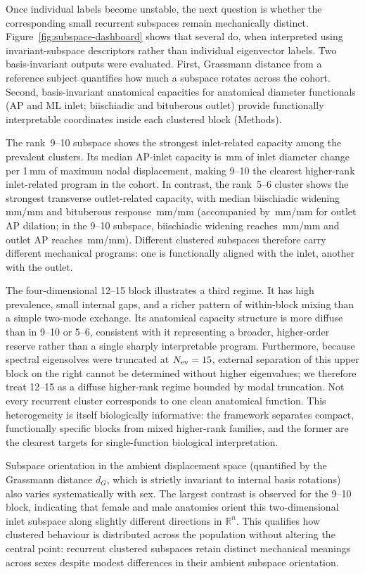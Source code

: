 \documentclass[11pt]{article}
\begin{document}
Once individual labels become unstable, the next question is whether the corresponding small recurrent subspaces remain mechanically distinct.
Figure~\ref{fig:subspace-dashboard} shows that several do, when interpreted using invariant-subspace descriptors rather than individual eigenvector labels.
Two basis-invariant outputs were evaluated.
First, Grassmann distance from a reference subject quantifies how much a subspace rotates across the cohort.
Second, basis-invariant anatomical capacities for anatomical diameter functionals (AP and ML inlet; biischiadic and bituberous outlet) provide functionally interpretable coordinates inside each clustered block (Methods).

The rank~9--10 subspace shows the strongest inlet-related capacity among the prevalent clusters.
Its median AP-inlet capacity is \BlockNineTenAP\,mm of inlet diameter change per 1\,mm of maximum nodal displacement, making 9--10 the clearest higher-rank inlet-related program in the cohort.
In contrast, the rank~5--6 cluster shows the strongest transverse outlet-related capacity, with median biischiadic widening \BlockFiveSixBIS\,mm/mm and bituberous response \BlockFiveSixBIT\,mm/mm (accompanied by \BlockFiveSixOUTLETAP\,mm/mm for outlet AP dilation; in the 9--10 subspace, biischiadic widening reaches \BlockNineTenBIS\,mm/mm and outlet AP reaches \BlockNineTenOUTLETAP\,mm/mm).
Different clustered subspaces therefore carry different mechanical programs: one is functionally aligned with the inlet, another with the outlet.

The four-dimensional 12--15 block illustrates a third regime.
It has high prevalence, small internal gaps, and a richer pattern of within-block mixing than a simple two-mode exchange.
Its anatomical capacity structure is more diffuse than in 9--10 or 5--6, consistent with it representing a broader, higher-order reserve rather than a single sharply interpretable program.
Furthermore, because spectral eigensolves were truncated at $N_{\rm ev}=15$, external separation of this upper block on the right cannot be determined without higher eigenvalues; we therefore treat 12--15 as a diffuse higher-rank regime bounded by modal truncation.
Not every recurrent cluster corresponds to one clean anatomical function.
This heterogeneity is itself biologically informative: the framework separates compact, functionally specific blocks from mixed higher-rank families, and the former are the clearest targets for single-function biological interpretation.


Subspace orientation in the ambient displacement space (quantified by the Grassmann distance $d_G$, which is strictly invariant to internal basis rotations) also varies systematically with sex.
The largest contrast is observed for the 9--10 block, indicating that female and male anatomies orient this two-dimensional inlet subspace along slightly different directions in $\mathbb{R}^n$.
This qualifies how clustered behaviour is distributed across the population without altering the central point: recurrent clustered subspaces retain distinct mechanical meanings across sexes despite modest differences in their ambient subspace orientation.
\end{document}
